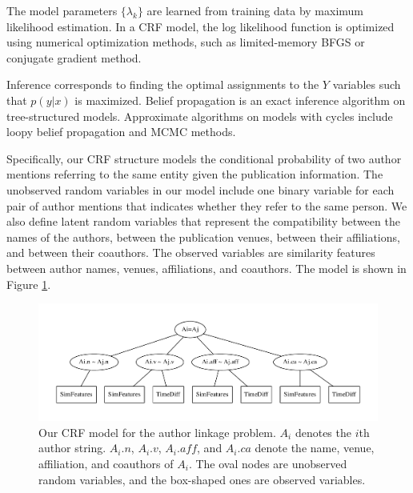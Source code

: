 \documentclass[twocolumn,letterpaper]{article}
\begin{document}
The model parameters $\{\lambda_k\}$ are learned from training data by
maximum likelihood estimation.  In a CRF model, the log likelihood
function is optimized using numerical optimization methods, such as
limited-memory BFGS or conjugate gradient method.

Inference corresponds to finding the optimal assignments to the $Y$
variables such that $p(y|x)$ is maximized.  Belief propagation is an
exact inference algorithm on tree-structured models.  Approximate
algorithms on models with cycles include loopy belief propagation and
MCMC methods.



Specifically, our CRF structure models the conditional probability of
two author mentions referring to the same entity given the publication
information.  The unobserved random variables in our model include one
binary variable for each pair of author mentions that indicates
whether they refer to the same person.  We also define latent random
variables that represent the compatibility between the names of the
authors, between the publication venues, between their affiliations,
and between their coauthors.  The observed variables are similarity
features between author names, venues, affiliations, and coauthors.
The model is shown in Figure \ref{fig:crf}.

\begin{figure}
\centering
\includegraphics[width=\textwidth]{crf}
\caption{Our CRF model for the author linkage problem.  $A_i$ denotes
  the $i$th author string.  $A_i.n$, $A_i.v$, $A_i.aff$, and $A_i.ca$
  denote the name, venue, affiliation, and coauthors of $A_i$.  The
  oval nodes are unobserved random variables, and the box-shaped ones
  are observed variables.}
\label{fig:crf}
\end{figure}
\end{document}
